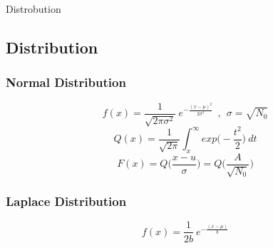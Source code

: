                Distrobution

\subsection{Distribution}
\subsubsection{Normal Distribution}
\setlength{\abovedisplayshortskip}{7pt}
\setlength{\belowdisplayshortskip}{7pt}
\large$$ f(x) = \frac{1}{\sqrt{2\pi\sigma^2}} ~ e^{-\frac{(x-\mu)^2}{2\sigma^2}} ~~ , ~~ \sigma = \sqrt{N_0}$$
\normalsize
\setlength{\abovedisplayshortskip}{7pt}
\setlength{\belowdisplayshortskip}{7pt}
$$ Q(x) = \frac{1}{\sqrt{2\pi}}\int_x^\infty exp\big(-\frac{t^2}{2}\big)~dt$$
$$ F(x) = Q\big(\frac{x-u}{\sigma}\big) = Q \big(\frac{A}{\sqrt{N_0}}\big)$$


\subsubsection{Laplace Distribution}
\setlength{\abovedisplayshortskip}{7pt}
\setlength{\belowdisplayshortskip}{7pt}
\large$$ f(x) = \frac{1}{2 b} ~ e^{-\frac{(x-\mu)}{b}}$$
